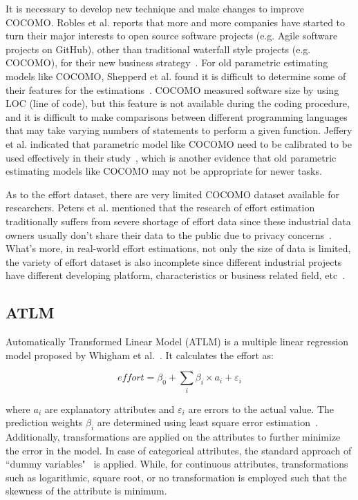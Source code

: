 \documentclass[sigconf,review,anonymous]{acmart}
\begin{document}
It is necessary to develop new technique and make changes to improve COCOMO. Robles et al. reports that more and more companies have started to turn their major interests to open source software projects (e.g. Agile software projects on GitHub), other than traditional waterfall style projects (e.g. COCOMO), for their new business strategy~\cite{robles2014estimating}. For old parametric estimating models like COCOMO, Shepperd et al. found it is difficult to determine some of their features for the estimations~\cite{shepperd2007software}. COCOMO measured software size by using LOC (line of code), but this feature is not available during the coding procedure, and it is difficult to make comparisons between different programming languages that may take varying numbers of statements to perform a given function. Jeffery et al. indicated that parametric model like COCOMO need to be calibrated to be used effectively in their study~\cite{jeffery1990calibrating}, which is another evidence that old parametric estimating models like COCOMO may not be appropriate for newer tasks. 

As to the effort dataset, there are very limited COCOMO dataset available for researchers. Peters et al. mentioned that the research of effort estimation traditionally suffers from severe shortage of effort data since these industrial data owners usually don't share their data to the public due to privacy concerns~\cite{peters2012privacy}. What's more, in real-world effort estimations, not only the size of data is limited, the variety of effort dataset is also incomplete since different industrial projects have different developing platform, characteristics or business related field, etc~\cite{qi2017software}.


\subsection{ATLM}
\label{sec:atlm}
Automatically Transformed Linear Model (ATLM) is a multiple linear regression model proposed by Whigham et al.~\cite{Whigham:2015}. It calculates the effort as:

\[
\mathit{effort} = \beta_0 + \sum_i\beta_i\times a_{i} +  \varepsilon_i
\]

where $a_i$ are explanatory attributes and $\varepsilon_i$ are errors to the actual value. The prediction weights $\beta_i$ are determined using least square error estimation~\cite{neter1996applied}. Additionally, transformations are applied on the attributes to further minimize the error in the model. In case of categorical attributes, the standard approach of ``dummy variables"~\cite{hardy1993regression} is applied. While, for continuous attributes, transformations such as logarithmic, square root,  or no transformation is employed such that the skewness of the attribute is minimum. 
\end{document}

